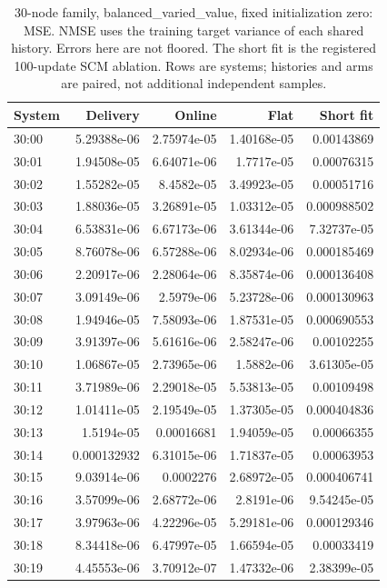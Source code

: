 \begin{table}[ht]
\centering\scriptsize
\begin{tabular}{lrrrr}
\toprule
System & Delivery & Online & Flat & Short fit\\
\midrule
30:00 & 5.29388e-06 & 2.75974e-05 & 1.40168e-05 & 0.00143869\\
30:01 & 1.94508e-05 & 6.64071e-06 & 1.7717e-05 & 0.00076315\\
30:02 & 1.55282e-05 & 8.4582e-05 & 3.49923e-05 & 0.00051716\\
30:03 & 1.88036e-05 & 3.26891e-05 & 1.03312e-05 & 0.000988502\\
30:04 & 6.53831e-06 & 6.67173e-06 & 3.61344e-06 & 7.32737e-05\\
30:05 & 8.76078e-06 & 6.57288e-06 & 8.02934e-06 & 0.000185469\\
30:06 & 2.20917e-06 & 2.28064e-06 & 8.35874e-06 & 0.000136408\\
30:07 & 3.09149e-06 & 2.5979e-06 & 5.23728e-06 & 0.000130963\\
30:08 & 1.94946e-05 & 7.58093e-06 & 1.87531e-05 & 0.000690553\\
30:09 & 3.91397e-06 & 5.61616e-06 & 2.58247e-06 & 0.00102255\\
30:10 & 1.06867e-05 & 2.73965e-06 & 1.5882e-06 & 3.61305e-05\\
30:11 & 3.71989e-06 & 2.29018e-05 & 5.53813e-05 & 0.00109498\\
30:12 & 1.01411e-05 & 2.19549e-05 & 1.37305e-05 & 0.000404836\\
30:13 & 1.5194e-05 & 0.00016681 & 1.94059e-05 & 0.00066355\\
30:14 & 0.000132932 & 6.31015e-06 & 1.71837e-05 & 0.00063953\\
30:15 & 9.03914e-06 & 0.0002276 & 2.68972e-05 & 0.000406741\\
30:16 & 3.57099e-06 & 2.68772e-06 & 2.8191e-06 & 9.54245e-05\\
30:17 & 3.97963e-06 & 4.22296e-05 & 5.29181e-06 & 0.000129346\\
30:18 & 8.34418e-06 & 6.47997e-05 & 1.66594e-05 & 0.00033419\\
30:19 & 4.45553e-06 & 3.70912e-07 & 1.47332e-06 & 2.38399e-05\\
\bottomrule
\end{tabular}
\caption{30-node family, balanced\_varied\_value, fixed initialization zero: MSE. NMSE uses the training target variance of each shared history. Errors here are not floored. The short fit is the registered 100-update SCM ablation. Rows are systems; histories and arms are paired, not additional independent samples.}
\end{table}
